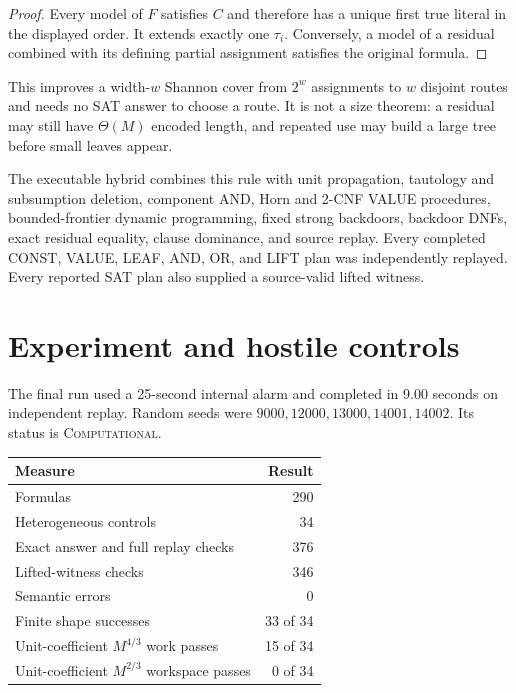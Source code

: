 \documentclass[11pt]{article}
\newcommand{\Comp}{\textsc{Computational}}
\begin{document}
\begin{proof}
Every model of $F$ satisfies $C$ and therefore has a unique first true
literal in the displayed order.  It extends exactly one $\tau_i$.  Conversely,
a model of a residual combined with its defining partial assignment satisfies
the original formula.
\end{proof}

This improves a width-$w$ Shannon cover from $2^w$ assignments to $w$
disjoint routes and needs no SAT answer to choose a route.  It is not a size
theorem: a residual may still have $\Theta(M)$ encoded length, and repeated
use may build a large tree before small leaves appear.

The executable hybrid combines this rule with unit propagation, tautology and
subsumption deletion, component AND, Horn and 2-CNF VALUE procedures,
bounded-frontier dynamic programming, fixed strong backdoors, backdoor DNFs,
exact residual equality, clause dominance, and source replay.  Every completed
CONST, VALUE, LEAF, AND, OR, and LIFT plan was independently replayed.  Every
reported SAT plan also supplied a source-valid lifted witness.

\section{Experiment and hostile controls}

The final run used a 25-second internal alarm and completed in 9.00 seconds
on independent replay.  Random seeds were
$9000,12000,13000,14001,14002$.  Its status is \Comp.

\begin{center}
\small
\begin{tabular}{lr}
\toprule
Measure & Result\\
\midrule
Formulas & 290\\
Heterogeneous controls & 34\\
Exact answer and full replay checks & 376\\
Lifted-witness checks & 346\\
Semantic errors & 0\\
Finite shape successes & 33 of 34\\
Unit-coefficient $M^{4/3}$ work passes & 15 of 34\\
Unit-coefficient $M^{2/3}$ workspace passes & 0 of 34\\
\bottomrule
\end{tabular}
\end{center}
\end{document}
